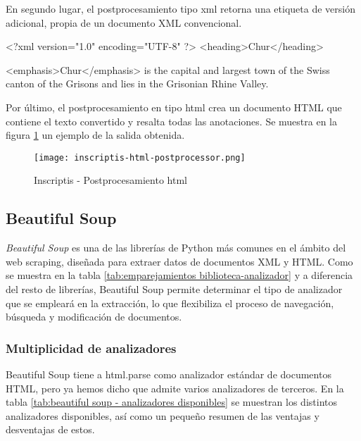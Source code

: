 En segundo lugar, el postprocesamiento tipo xml retorna una etiqueta de versión adicional, propia de un
documento XML convencional.

\begin{Schunk}
  \begin{Soutput}
    <?xml version="1.0" encoding="UTF-8" ?>
    <heading>Chur</heading>

    <emphasis>Chur</emphasis> is the capital and largest town of the 
    Swiss canton of the Grisons and lies in the Grisonian Rhine Valley.
  \end{Soutput}
\end{Schunk}

Por último, el postprocesamiento en tipo html crea un documento HTML que contiene el texto convertido y 
resalta todas las anotaciones. Se muestra en la figura \ref{img: inscriptis - postprocesamiento html} un 
ejemplo de la salida obtenida.

\begin{figure}[tphb]
  \centering
  \texttt{[image: inscriptis-html-postprocessor.png]}
  \caption{Inscriptis - Postprocesamiento html}
  \label{img: inscriptis - postprocesamiento html}
\end{figure}

\subsection{Beautiful Soup}
\label{subsec:beautiful soup}

\emph{Beautiful Soup} \cite{beautifulsoup} es una de las librerías de Python más comunes en el ámbito del
web scraping, diseñada para extraer datos de documentos XML y HTML. Como se muestra en la tabla
\ref{tab:emparejamientos biblioteca-analizador} y a diferencia del resto de librerías, Beautiful Soup 
permite determinar el tipo de analizador que se empleará en la extracción, lo que flexibiliza el proceso 
de navegación, búsqueda y modificación de documentos.

\subsubsection{Multiplicidad de analizadores}
\label{subsubsec:multiplicidad de analizadores}

Beautiful Soup tiene a html.parse como analizador estándar de documentos HTML, pero ya hemos dicho que 
admite varios analizadores de terceros. En la tabla \ref{tab:beautiful soup - analizadores disponibles} 
se muestran los distintos analizadores disponibles, así como un pequeño resumen de las ventajas y desventajas 
de estos.

